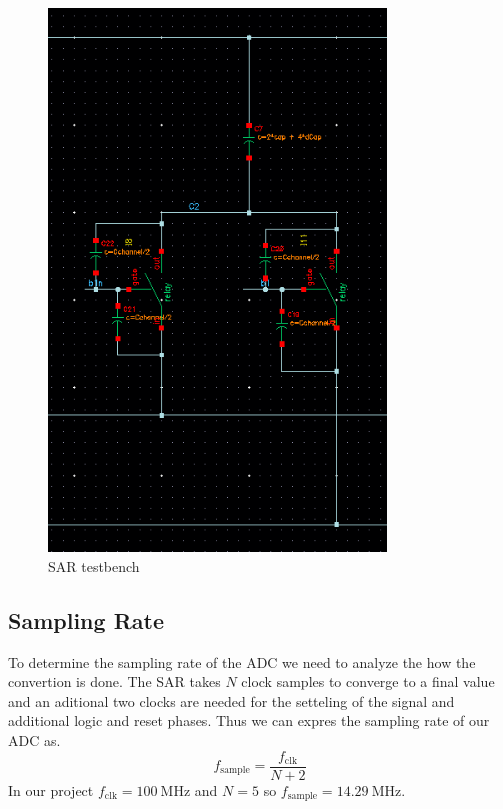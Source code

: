 \documentclass{article}
\newcommand*{\subb}[1]{\ensuremath{_{\mathrm{#1}}}}
\begin{document}
 \begin{figure}[h]
  \centering
  \includegraphics[width=0.8\textwidth]{./img/m3_sar_closeup}
  \caption{SAR testbench}
  \label{fig:dac_cp}
 \end{figure}
 \subsection{Sampling Rate}
 To determine the sampling rate of the ADC we need to analyze the how the convertion is done. The SAR takes $N$ clock samples to converge to a final value and an aditional two clocks are needed for the setteling of the signal and additional logic and reset phases. Thus we can expres the sampling rate of our ADC as.
 \begin{equation}
  f\subb{sample} = \frac{f\subb{clk}}{N+2}
 \end{equation}
 In our project $f\subb{clk}=\SI{100}{\MHz}$ and $N=5$ so $f\subb{sample}=\SI{14.29}{\MHz}$.
\end{document}
